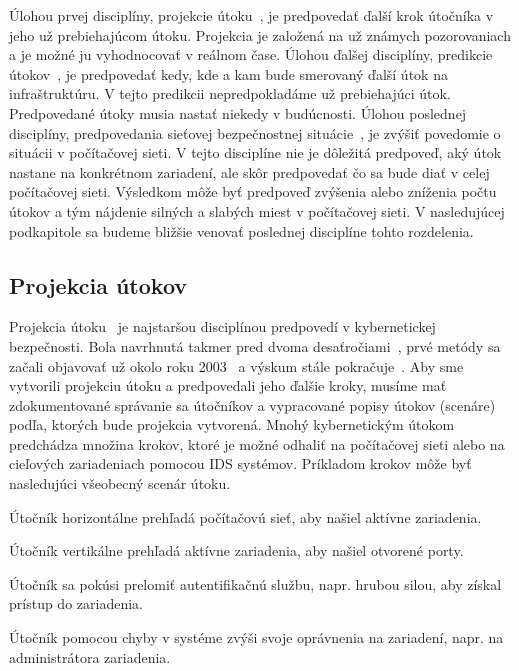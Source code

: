 \documentclass[thesismargins, thesislinespacing, openright, upjsfrontpage, combineabstracts]{rnthesis}
\begin{document}
Úlohou prvej disciplíny, projekcie útoku~\cite{Yang2014}, je predpovedať ďalší krok útočníka v jeho už prebiehajúcom útoku. Projekcia je založená na už známych pozorovaniach a je možné ju vyhodnocovať v reálnom čase. Úlohou ďalšej disciplíny, predikcie útokov~\cite{Abdlhamed2017}, je predpovedať kedy, kde a kam bude smerovaný ďalší útok na infraštruktúru. V tejto predikcii nepredpokladáme už prebiehajúci útok. Predpovedané útoky musia nastať niekedy v budúcnosti. Úlohou poslednej disciplíny, predpovedania sieťovej bezpečnostnej situácie~\cite{wei2013comprehensive,Leau2015}, je zvýšiť povedomie o situácii v počítačovej sieti. V tejto disciplíne nie je dôležitá predpoveď, aký útok nastane na konkrétnom zariadení, ale skôr predpovedať čo sa bude diať v celej počítačovej sieti. Výsledkom môže byť predpoveď zvýšenia alebo zníženia počtu útokov a tým nájdenie silných a slabých miest v počítačovej sieti. V nasledujúcej podkapitole sa budeme bližšie venovať poslednej disciplíne tohto rozdelenia.

\subsection{Projekcia útokov}

Projekcia útoku~\cite{Yang2014} je najstaršou disciplínou predpovedí v kybernetickej bezpečnosti. Bola navrhnutá takmer pred dvoma desaťročiami~\cite{geib2001plan}, prvé metódy sa začali objavovať už okolo roku 2003~\cite{hughes2003attack,qin2004attack} a výskum stále pokračuje~\cite{ahmed2017attack,zhang2019intrusion}. Aby sme vytvorili projekciu útoku a predpovedali jeho ďalšie kroky, musíme mať zdokumentované správanie sa útočníkov a vypracované popisy útokov (scenáre) podľa, ktorých bude projekcia vytvorená. Mnohý kybernetickým útokom predchádza množina krokov, ktoré je možné odhaliť na počítačovej sieti alebo na cieľových zariadeniach pomocou IDS systémov. Príkladom krokov môže byť nasledujúci všeobecný scenár útoku.

\begin{compactenum}
    \item Útočník horizontálne prehľadá počítačovú sieť, aby našiel aktívne zariadenia.
    \item Útočník vertikálne prehľadá aktívne zariadenia, aby našiel otvorené porty.
    \item Útočník sa pokúsi prelomiť autentifikačnú službu, napr. hrubou silou, aby získal prístup do zariadenia.
    \item Útočník pomocou chyby v systéme zvýši svoje oprávnenia na zariadení, napr. na administrátora zariadenia.
\end{compactenum}
\end{document}
